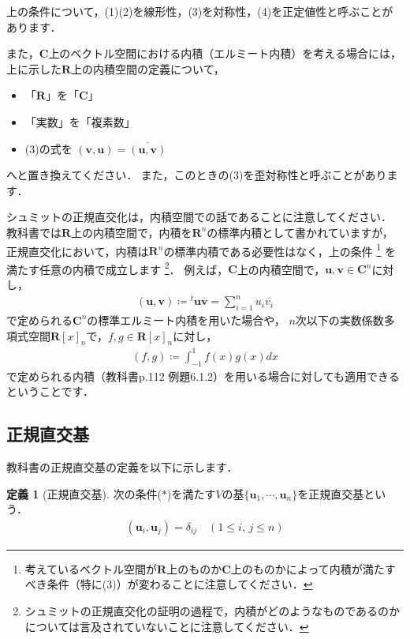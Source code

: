 \documentclass[dvipdfmx]{jsarticle}
\theoremstyle{definition}
\newtheorem*{definition*}{定義}
\begin{document}
上の条件について，(1)(2)を線形性，(3)を対称性，(4)を正定値性と呼ぶことがあります．

また，$\bm{C}$上のベクトル空間における内積（エルミート内積）を考える場合には，上に示した$\bm{R}$上の内積空間の定義について，
\begin{itemize}
    \item 「$\bm{R}$」を「$\bm{C}$」
    \item 「実数」を「複素数」
    \item (3)の式を $(\bm{v}, \bm{u}) = \overline{(\bm{u}, \bm{v})}$
\end{itemize}
へと置き換えてください．
また，このときの(3)を歪対称性と呼ぶことがあります．

シュミットの正規直交化は，内積空間での話であることに注意してください．
教科書では$\bm{R}$上の内積空間で，内積を$\bm{R}^n$の標準内積として書かれていますが，
正規直交化において，内積は$\bm{R}^n$の標準内積である必要性はなく，上の条件
\footnote{
    考えているベクトル空間が$\bm{R}$上のものか$\bm{C}$上のものかによって内積が満たすべき条件（特に(3)）が変わることに注意してください．
}
を満たす任意の内積で成立します
\footnote{
    シュミットの正規直交化の証明の過程で，内積がどのようなものであるのかについては言及されていないことに注意してください．
}．
例えば，$\bm{C}$上の内積空間で，$\bm{u}, \bm{v} \in \bm{C}^n$に対し，
\begin{align}
    (\bm{u}, \bm{v}) \coloneqq {}^{t}\bm{u} \overline{\bm{v}} = \sum_{i=1}^n u_i \overline{v_i}
    \label{norm_hermit}
\end{align}
で定められる$\bm{C}^n$の標準エルミート内積を用いた場合や，
$n$次以下の実数係数多項式空間$\bm{R}[x]_n$で，$f, g \in \bm{R}[x]_n$に対し，
\begin{align}
    (f, g) \coloneqq \int_{-1}^{1} f(x) g(x) dx
    \label{func_ip}
\end{align}
で定められる内積（教科書p.112 例題6.1.2）を用いる場合に対しても適用できるということです．


\subsection{正規直交基}
教科書の正規直交基の定義を以下に示します．

\begin{leftbar}
    \begin{definition*}[正規直交基]
        次の条件($\ast$)を満たす$V$の基$\{ \bm{u}_1, \cdots, \bm{u}_n \}$を正規直交基という．
        \begin{align}
            (\bm{u}_i, \bm{u}_j) = \delta_{ij} \quad (1 \leq i, \, j \leq n) \tag{$\ast$}
        \end{align}
    \end{definition*}
\end{leftbar}
\end{document}
